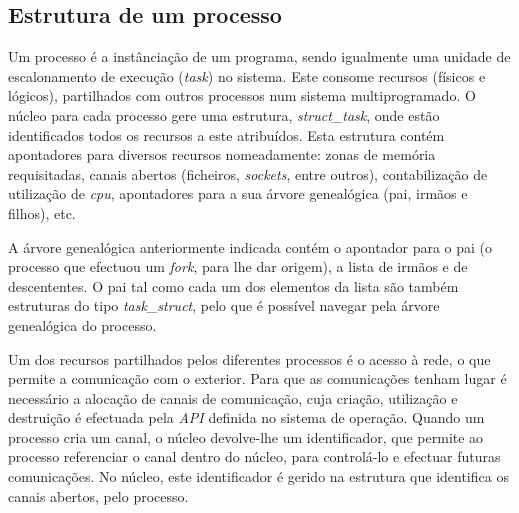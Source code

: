 



\subsection{Estrutura de um processo}

Um processo é a instânciação de um programa, sendo igualmente uma unidade de escalonamento de execução (\textit{task}) no sistema.
Este consome recursos (físicos e lógicos), partilhados com outros processos num sistema multiprogramado.
O núcleo para cada processo gere uma estrutura, \textit{struct\_task}, onde estão identificados todos os recursos a este atribuídos.
Esta estrutura contém apontadores para diversos recursos nomeadamente: zonas de memória requisitadas, canais abertos (ficheiros, \textit{sockets}, entre outros), contabilização de utilização de \textit{cpu}, apontadores para a sua árvore genealógica (pai, irmãos e filhos), etc.

A árvore genealógica anteriormente indicada contém o apontador para o pai (o processo que efectuou um \textit{fork}, para lhe dar origem), a lista de irmãos e de descententes.
O pai tal como cada um dos elementos da lista são também estruturas do tipo \textit{task\_struct}, pelo que é possível navegar pela árvore genealógica do processo.

Um dos recursos partilhados pelos diferentes processos é o acesso à rede, o que permite a comunicação com o exterior.
Para que as comunicações tenham lugar é necessário a alocação de canais de comunicação, cuja criação, utilização e destruição é efectuada pela \textit{API} definida no sistema de operação.
Quando um processo cria um canal, o núcleo devolve-lhe um identificador, que permite ao processo referenciar o canal dentro do núcleo, para controlá-lo e efectuar futuras comunicações.
No núcleo, este identificador é gerido na estrutura que identifica os canais abertos, pelo processo.

